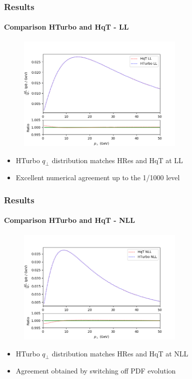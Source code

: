 \documentclass[aspectratio=43]{beamer}
\begin{document}
\begin{frame}
	
	\frametitle{Results}
	\framesubtitle{Comparison HTurbo and HqT - LL}
	
	\begin{figure}
		\includegraphics[width = 8cm]{plots/hturbo_LL.png}
	\end{figure}
	
	\begin{itemize}
		\item HTurbo $q_{\perp}$ distribution matches HRes and HqT at LL
		\item Excellent numerical agreement up to the 1/1000 level
	\end{itemize}

\end{frame}

\begin{frame}

	\frametitle{Results}
	\framesubtitle{Comparison HTurbo and HqT - NLL}
	
	\begin{figure}
		\includegraphics[width = 8cm]{plots/hturbo_NLL_noevol.png}
	\end{figure}
	
	\begin{itemize}
		\item HTurbo $q_{\perp}$ distribution matches HRes and HqT at NLL
		\item Agreement obtained by switching off PDF evolution
	\end{itemize}

\end{frame}
\end{document}
